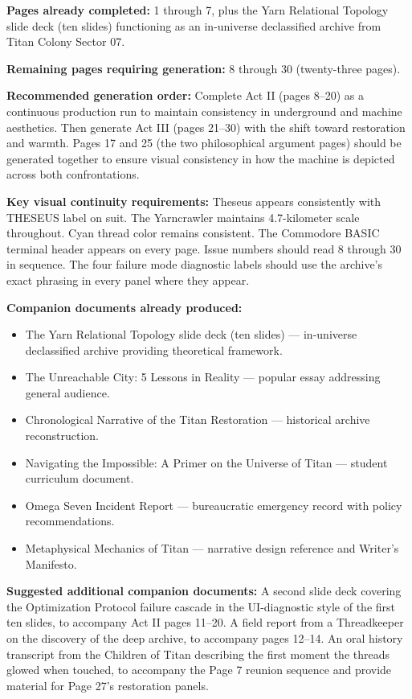 \documentclass[11pt]{article}
\begin{document}
\textbf{Pages already completed:} 1 through 7, plus the Yarn Relational Topology slide deck (ten slides) functioning as an in-universe declassified archive from Titan Colony Sector 07.

\textbf{Remaining pages requiring generation:} 8 through 30 (twenty-three pages).

\textbf{Recommended generation order:} Complete Act II (pages 8--20) as a continuous production run to maintain consistency in underground and machine aesthetics. Then generate Act III (pages 21--30) with the shift toward restoration and warmth. Pages 17 and 25 (the two philosophical argument pages) should be generated together to ensure visual consistency in how the machine is depicted across both confrontations.

\textbf{Key visual continuity requirements:} Theseus appears consistently with THESEUS label on suit. The Yarncrawler maintains 4.7-kilometer scale throughout. Cyan thread color remains consistent. The Commodore BASIC terminal header appears on every page. Issue numbers should read 8 through 30 in sequence. The four failure mode diagnostic labels should use the archive's exact phrasing in every panel where they appear.

\textbf{Companion documents already produced:}
\begin{itemize}[leftmargin=1.5em]
\item The Yarn Relational Topology slide deck (ten slides) --- in-universe declassified archive providing theoretical framework.
\item The Unreachable City: 5 Lessons in Reality --- popular essay addressing general audience.
\item Chronological Narrative of the Titan Restoration --- historical archive reconstruction.
\item Navigating the Impossible: A Primer on the Universe of Titan --- student curriculum document.
\item Omega Seven Incident Report --- bureaucratic emergency record with policy recommendations.
\item Metaphysical Mechanics of Titan --- narrative design reference and Writer's Manifesto.
\end{itemize}

\textbf{Suggested additional companion documents:} A second slide deck covering the Optimization Protocol failure cascade in the UI-diagnostic style of the first ten slides, to accompany Act II pages 11--20. A field report from a Threadkeeper on the discovery of the deep archive, to accompany pages 12--14. An oral history transcript from the Children of Titan describing the first moment the threads glowed when touched, to accompany the Page 7 reunion sequence and provide material for Page 27's restoration panels.
\end{document}
